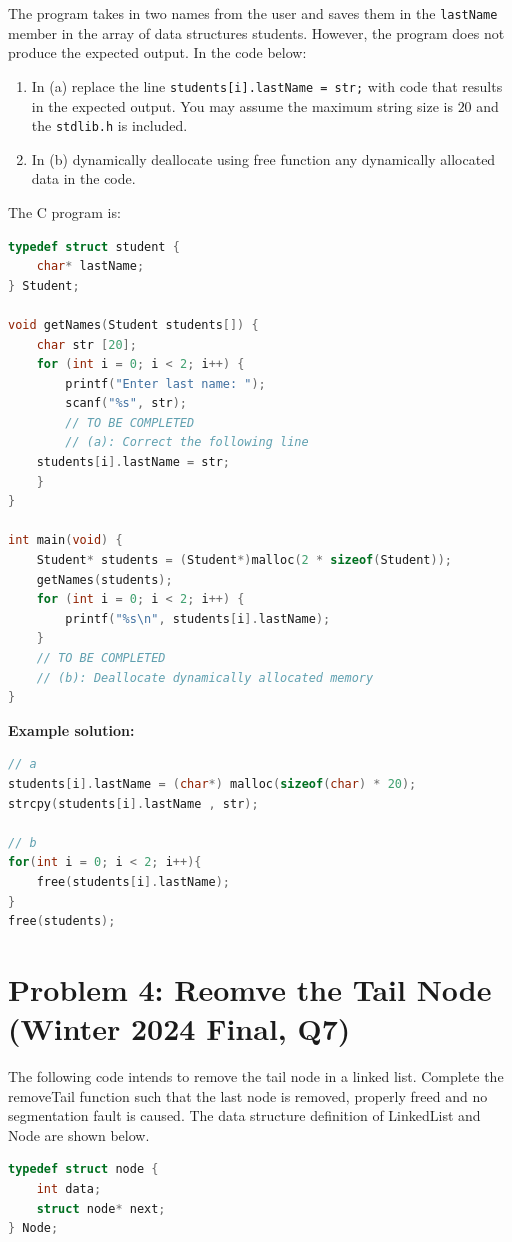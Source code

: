 \documentclass[12pt]{article}
\begin{document}
{The program takes in two names from the user and saves them in the \texttt{lastName} member in the array of data structures students. However, the program does not produce the expected output. In the code below:
\begin{enumerate}
	\item In (a) replace the line \texttt{students[i].lastName = str;} with code that results in the expected output. You may assume the maximum string size is $20$ and the \texttt{stdlib.h} is included.
	\item In (b) dynamically deallocate using free function any dynamically allocated data in the code. 
\end{enumerate}

The C program is:
\begin{lstlisting}[language=C]
typedef struct student {
	char* lastName; 
} Student;

void getNames(Student students[]) { 
	char str [20];
	for (int i = 0; i < 2; i++) {
		printf("Enter last name: "); 
		scanf("%s", str);
		// TO BE COMPLETED
		// (a): Correct the following line 
	students[i].lastName = str;
	}
}

int main(void) {
	Student* students = (Student*)malloc(2 * sizeof(Student));
	getNames(students);
	for (int i = 0; i < 2; i++) {
		printf("%s\n", students[i].lastName);
	}
	// TO BE COMPLETED
	// (b): Deallocate dynamically allocated memory
}
\end{lstlisting}

\textbf{Example solution:}
\begin{lstlisting}[language=C]
// a
students[i].lastName = (char*) malloc(sizeof(char) * 20); 
strcpy(students[i].lastName , str);

// b
for(int i = 0; i < 2; i++){ 
	free(students[i].lastName);
} 
free(students);
\end{lstlisting}

\section*{Problem 4: Reomve the Tail Node (Winter 2024 Final, Q7)}

The following code intends to remove the tail node in a linked list. Complete the removeTail function such that the last node is removed, properly freed and no segmentation fault is caused. The data structure definition of LinkedList and Node are shown below.


\begin{lstlisting}[language=C]
typedef struct node { 
	int data;
	struct node* next;
} Node;


\end{lstlisting}}
\end{document}
